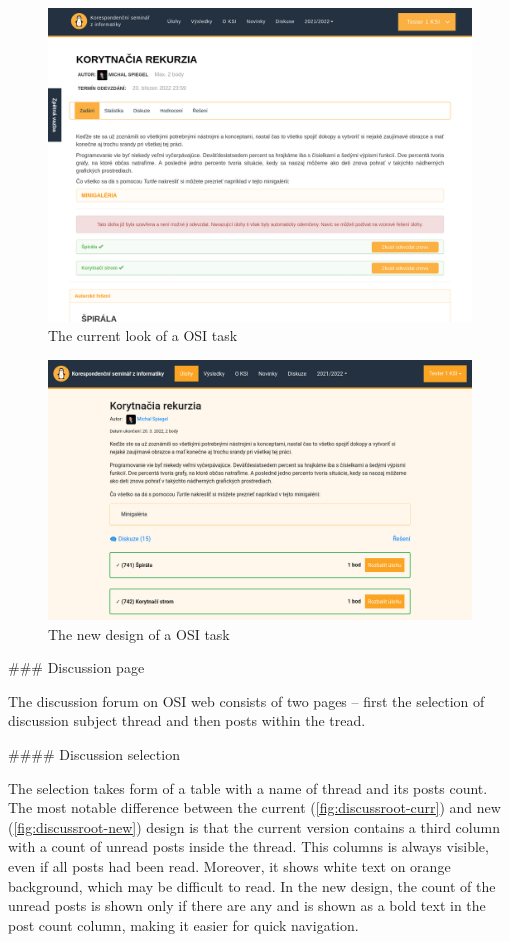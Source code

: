 \documentclass[
  digital, %
  oneside, %
  lof,     %
  lot,     %
]{fithesis4}
\begin{document}
{\begin{figure}
\includegraphics[width=.9\textwidth]{assets/img/task-curr}
\caption{The current look of a OSI task}
\label{fig:task-curr}
\end{figure}

\begin{figure}
\includegraphics[width=\textwidth]{assets/img/task-new}
\caption{The new design of a OSI task}
\label{fig:task-new}
\end{figure}


### Discussion page

The discussion forum on OSI web consists of two pages -- first the selection of discussion subject thread and then posts within the tread.

#### Discussion selection

The selection takes form of a table with a name of thread and its posts count. The most notable difference between the current (\ref{fig:discussroot-curr}) and new (\ref{fig:discussroot-new}) design is that the current version contains a third column with a count of unread posts inside the thread. This columns is always visible, even if all posts had been read. Moreover, it shows white text on orange background, which may be difficult to read. In the new design, the count of the unread posts is shown only if there are any and is shown as a bold text in the post count column, making it easier for quick navigation.

}
\end{document}
